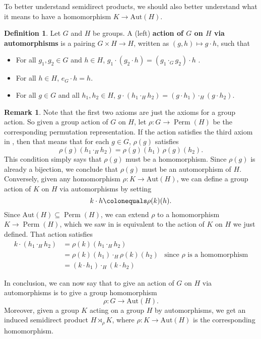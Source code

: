 \documentclass[12pt]{report}
\numberwithin{equation}{section}
\numberwithin{theorem}{chapter}
\theoremstyle{definition}
\newtheorem{definition}[theorem]{Definition}
\newtheorem*{basic properties}{Basic Properties}
\newtheorem*{Important Remark}{Important Remark}
\newtheorem{remark}[theorem]{Remark}
\DeclareMathOperator{\Perm}{Perm}
\def\sdp{\rtimes}
\begin{document}
To better understand semidirect products, we should also better understand what it means to have a homomorphism $K \to \mathrm{Aut}(H)$.


\begin{definition}\label{def action via autos}
Let $G$ and $H$ be groups. A (left) {\bf action of $G$ on $H$ via automorphisms} is a pairing $G \times H \to H$, written as $(g,h) \mapsto g \cdot h$, such that
\begin{itemize}[itemsep=-0.1em]
\item For all $g_1, g_2 \in G$ and $h \in H$, $g_1 \cdot (g_2 \cdot h) = (g_1 \cdot _G g_2) \cdot h$ .
\item For all $h \in H$, $e_G \cdot h = h$.
\item For all $g \in G$ and all $h_1, h_2 \in H$,  $g \cdot (h_1 \cdot_H h_2) = (g \cdot h_1) \cdot_H (g \cdot h_2)$.
\end{itemize} 	
\end{definition}

\begin{remark}
Note that the first two axioms are just the axioms for a group action. So given a group action of $G$ on $H$, let $\rho\!: G \to \Perm(H)$ be the corresponding permutation representation. If the action satisfies the third axiom in , then that means that for each $g \in G$, $\rho(g)$ satisfies
$$\rho(g) (h_1 \cdot_H h_2) = \rho(g)(h_1) \, \rho(g)(h_2).$$
This condition simply says that $\rho(g)$ must be a homomorphism. Since $\rho(g)$ is already a bijection, we conclude that $\rho(g)$ must be an automorphism of $H$. 
Conversely, given any homomorphism $\rho\!: K \to \mathrm{Aut}(H)$, we can define a group action of $K$ on $H$ via automorphisms by setting
$$k \cdot h \colonequals \rho(k)(h).$$
Since $\mathrm{Aut}(H) \subseteq \Perm(H)$, we can extend $\rho$ to a homomorphism $K \to \Perm(H)$, which we saw in  is equivalent to the action of $K$ on $H$ we just defined. That action satisfies
$$\begin{aligned}
k \cdot (h_1 \cdot_H h_2) & = \rho(k)(h_1 \cdot_H h_2) \\
& = \rho(k)(h_1) \cdot_H \rho(k)(h_2) & \text{since $\rho$ is a homomorphism} \\
& = (k \cdot h_1) \cdot_H (k \cdot h_2)
\end{aligned}$$


In conclusion, we can now say that to give an action of $G$ on $H$ via automorphisms is to give a group homomorphism 
$$\rho\!: G \to \mathrm{Aut}(H).$$
Moreover, given a group $K$ acting on a group $H$ by automorphisms, we get an induced semidirect product $H \sdp_\rho K$, where $\rho\!: K \to \mathrm{Aut}(H)$ is the corresponding homomorphism. 
\end{remark}
\end{document}
